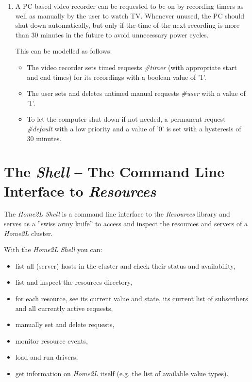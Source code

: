 \documentclass[12pt,english,parskip=half,headheight=19pt]{scrreprt}
\makeatletter
\newcommand{\labeltool}[1]{\index{#1@\texttt{#1} (tool)} \label{tool:#1}}
\makeatother
\begin{document}
{\begin{enumerate}
  \item
    A PC-based video recorder can be requested to be on by recording timers as well as
    manually by the user to watch TV. Whenever unused, the PC should shut
    down automatically, but only if the time of the next recording is more
    than 30 minutes in the future to avoid unnecessary power cycles.

    This can be modelled as follows:
    \begin{itemize}
    \item
      The video recorder sets timed requests \textit{\#timer}
      (with appropriate start and end times) for its recordings with a boolean
      value of '1'.
    \item
      The user sets and deletes untimed manual requests \textit{\#user} with
      a value of '1'.
    \item
      To let the computer shut down if not needed, a permanent request
      \textit{\#default} with a low priority and a value of '0' is set with a
      hysteresis of 30 minutes.
    \end{itemize}

  \end{enumerate}
}





%
\clearpage
\section{The \textit{Shell} -- The Command Line Interface to \textit{Resources}}
\label{sec:shell} \labeltool{home2l-shell}
%


The \textit{Home2L Shell} is a command line interface to the \textit{Resources} library and serves as a ''swiss army knife'' to access and inspect the resources and servers of a \textit{Home2L} cluster.

With the \textit{Home2L Shell} you can:
\begin{itemize}
  \item list all (server) hosts in the cluster and check their status and availability,
  \item list and inspect the resources directory,
  \item for each resource, see its current value and state, its current list of subscribers and
  all currently active requests,
  \item manually set and delete requests,
  \item monitor resource events,
  \item load and run drivers,
  \item get information on \textit{Home2L} itself (e.g. the list of available value types).
\end{itemize}
\end{document}
